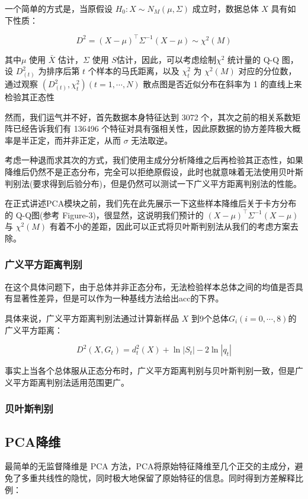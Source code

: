 \documentclass[fleqn]{Paquetes/RevDigMatEduInt}
\begin{document}
一个简单的方式是，当原假设 $H_0:X\sim N_M(\mu,\Sigma)$ 成立时，数据总体 $X$ 具有如下性质：

\begin{lema}
	$$D^2 = (X - \mu)^\top \Sigma^{-1} (X - \mu) \sim \chi^2(M)$$
\end{lema}

其中$\mu$ 使用 $\bar{X}$ 估计，$\Sigma$ 使用 $S $估计，因此，可以考虑绘制$\chi^2$ 统计量的 Q-Q 图，设 $D_{(t)}^2$ 为排序后第 $t$ 个样本的马氏距离，以及 $\chi_t^2$ 为 $\chi^2(M)$ 对应的分位数，通过观察 $(D_{(t)}^2,\chi_t^2)(t = 1,\cdots,N)$ 散点图是否近似分布在斜率为 1 的直线上来检验其正态性

然而，我们运气并不好，首先数据本身特征达到 3072 个，其次之前的相关系数矩阵已经告诉我们有 136496 个特征对具有强相关性，因此原数据的协方差阵极大概率是半正定，而并非正定，从而 $\sigma$ 无法取逆。

考虑一种退而求其次的方式，我们使用主成分分析降维之后再检验其正态性，如果降维后仍然不是正态分布，完全可以拒绝原假设，此时也就意味着无法使用贝叶斯判别法(要求得到后验分布)，但是仍然可以测试一下广义平方距离判别法的性能。

在正式讲述PCA模块之前，我们先在此先展示一下这些样本降维后关于卡方分布的 Q-Q图(参考 Figure-3)，很显然，这说明我们预计的 $ (X - \mu)^\top \Sigma^{-1} (X - \mu)$ 与 $\chi^2(M)$ 有着不小的差距，因此可以正式将贝叶斯判别法从我们的考虑方案去除。

\subsubsection{广义平方距离判别}
在这个具体问题下，由于总体并非正态分布，无法检验样本总体之间的均值是否具有显著性差异，但是可以作为一种基线方法给出acc的下界。

具体来说，广义平方距离判别法通过计算新样品 $X$ 到9个总体$G_i(i=0,\cdots,8)$的广义平方距离：

$$
D^2(X,G_t) = d_t^2(X) + \ln |S_t| - 2\ln | q_t| 
$$

事实上当各个总体服从正态分布时，广义平方距离判别与贝叶斯判别一致，但是广义平方距离判别法适用范围更广。
 
\subsubsection{贝叶斯判别}

\subsection{PCA降维}
最简单的无监督降维是 PCA 方法，PCA将原始特征降维至几个正交的主成分，避免了多重共线性的隐忧，同时极大地保留了原始特征的信息。同时得到方差解释比例：
\end{document}
